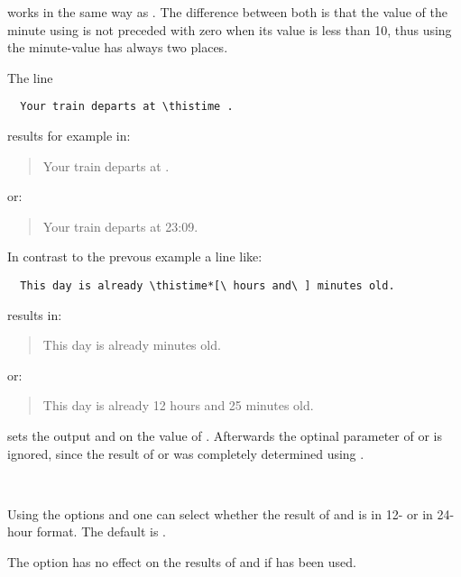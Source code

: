  works in the same way as .
The difference between both is that the value of the minute
using  is not preceded with zero when its value
is less than 10, thus using  the minute-value
has always two places.
\begin{Example}
  The line
\begin{lstlisting}
  Your train departs at \thistime .
\end{lstlisting}
  results for example in:
  \begin{quote}
    Your train departs at \thistime .
  \end{quote}
  or:
  \begin{quote}
    Your train departs at 23:09.
  \end{quote}
  \bigskip
  In contrast to the prevous example a line like:
\begin{lstlisting}
  This day is already \thistime*[\ hours and\ ] minutes old.
\end{lstlisting}
  results in:
  \begin{quote}
    This day is already  minutes old.
  \end{quote}
  or:
  \begin{quote}
    This day is already 12 hours and 25 minutes old.
  \end{quote}
\end{Example}

\begin{Declaration}%
\end{Declaration}%
%
 sets the output  and
 on the value of .
Afterwards the optinal parameter of  or
 is ignored, since the result
of  or 
was completely determined using .%

\begin{Declaration}
  \\
\end{Declaration}%
%
Using the options  and  one can
select whether the result of  and 
is in 12- or in 24-hour format. The default is .%

The option has no effect on the results of
 and  if 
has been used.%


